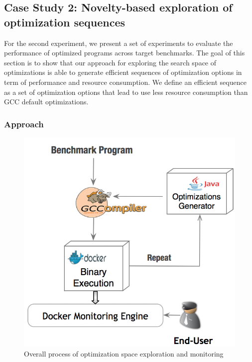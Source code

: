 \subsection{Case Study 2: Novelty-based exploration of optimization sequences}
For the second experiment, we present a set of experiments to evaluate the performance of optimized programs across target benchmarks. The goal of this section
is to show that our approach for exploring the search space of optimizations is able to generate efficient sequences of optimization options in term of performance and
resource consumption. We define an efficient sequence as a
set of optimization options that lead to use less resource consumption than GCC default optimizations.

\subsubsection{Approach}
\begin{figure}[h]
	\centering
	\includegraphics[scale=0.50]{Ressources/infra_novelty.png}
	\caption{Overall process of optimization space exploration and monitoring}
\end{figure}

